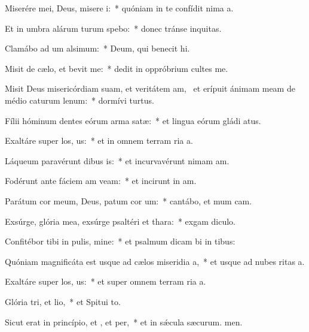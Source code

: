 \item Miserére mei, Deus, misere i:~* quóniam in te confídit nima a.
\item Et in umbra alárum turum spebo:~* donec tránse inquitas.
\item Clamábo ad um alsimum:~* Deum, qui benecit hi.
\item Misit de cælo, et bevit me:~* dedit in oppróbrium cultes me.
\item Misit Deus misericórdiam suam, et veritátem am,~\pscross{} et erípuit ánimam meam de médio caturum lenum:~* dormívi turtus.
\item Fílii hóminum dentes eórum arma  satæ:~* et lingua eórum gládi atus.
\item Exaltáre super los, us:~* et in omnem terram ria a.
\item Láqueum paravérunt dibus is:~* et incurvavérunt nimam am.
\item Fodérunt ante fáciem am veam:~* et incirunt in am.
\item Parátum cor meum, Deus, patum cor um:~* cantábo, et mum cam.
\item Exsúrge, glória mea, exsúrge psaltéri et thara:~* exgam diculo.
\item Confitébor tibi in pulis, mine:~* et psalmum dicam bi in tibus:
\item Quóniam magnificáta est usque ad cælos miseridia a,~* et usque ad nubes ritas a.
\item Exaltáre super los, us:~* et super omnem terram ria a.
\item Glória tri, et lio,~* et Spitui to.
\item Sicut erat in princípio, et , et per,~* et in sǽcula sæcurum. men.

